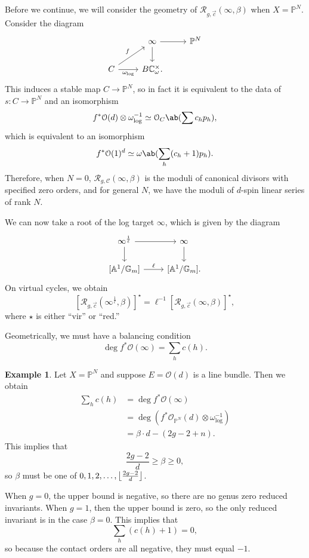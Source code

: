 \documentclass[10pt]{amsart}
\DeclarePairedDelimiter{\floor}{\lfloor}{\rfloor}
\theoremstyle{definition}
\newtheorem{exm}[thm]{Example}
\theoremstyle{remark}
\theoremstyle{plain}
\theoremstyle{definition}
\theoremstyle{remark}
\newcommand{\A}{\mathbb{A}}
\newcommand{\G}{\mathbb{G}}
\newcommand{\C}{\mathbb{C}}
\renewcommand{\P}{\mathbb{P}}
\newcommand{\mc}[1]{\mathcal{#1}}
\newcommand{\1}{\mathbf{1}}
\newcommand{\2}{\mathbf{2}}
\newcommand{\3}{\mathbf{3}}
\begin{document}
Before we continue, we will consider the geometry of $\mc{R}_{g, \vec{c}}(\infty, \beta)$ when $X = \P^N$. Consider the diagram
\begin{equation*}
\begin{tikzcd}
    & \infty \ar{r} \ar{d} & \P^N \\
    C \ar{ur}{f} \ar[swap]{r}{\omega_{\log}} & B \C_{\omega}^{\times}.
\end{tikzcd}
\end{equation*}
This induces a stable map $C \to \P^N$, so in fact it is equivalent to the data of $s \colon C \to \P^N$ and an isomorphism
\[ f^* \mc{O}(d) \otimes \omega_{\log}^{-1} \simeq \mc{O}_C\ab(\sum c_h p_h), \]
which is equivalent to an isomorphism
\[ f^* \mc{O}(1)^d \simeq \omega \ab(\sum_h (c_h+1)p_h). \]
Therefore, when $N = 0$, $\mc{R}_{g,\mc{C}}(\infty, \beta)$ is the moduli of canonical divisors with specified zero orders, and for general $N$, we have the moduli of $d$-spin linear series of rank $N$.

We can now take a root of the log target $\infty$, which is given by the diagram
\begin{equation*}
\begin{tikzcd}
    \infty^{\frac{1}{\ell}} \ar{r} \ar{d} & \infty \ar{d} \\
    {[\A^1/\G_m]} \ar{r}{\ell} & {[\A^1/\G_m]}.
\end{tikzcd}
\end{equation*}
On virtual cycles, we obtain
\[ [\mc{R}_{g, \vec{c}}(\infty^{\frac{1}{\ell}}, \beta)]^{\star} = \ell^{-1} [\mc{R}_{g, \vec{c}}(\infty, \beta)]^{\star}, \]
where $\star$ is either ``vir'' or ``red.''

Geometrically, we must have a balancing condition
\[ \deg f^* \mc{O}(\infty) = \sum_h c(h). \]

\begin{exm}
    Let $X = \P^N$ and suppose $E = \mc{O}(d)$ is a line bundle. Then we obtain
    \begin{align*}
        \sum_h c(h) &= \deg f^* \mc{O}(\infty) \\
        &= \deg (f^* \mc{O}_{\P^N}(d)\otimes \omega_{\log}^{-1}) \\
        &= \beta \cdot d - (2g-2+n).
    \end{align*}
    This implies that
    \[ \frac{2g-2}{d} \geq \beta \geq 0, \]
    so $\beta$ must be one of $0,1,2,\ldots,\floor*{\frac{2g-2}{d}}$.

    When $g=0$, the upper bound is negative, so there are no genus zero reduced invariants. When $g=1$, then the upper bound is zero, so the only reduced invariant is in the case $\beta = 0$. This implies that
    \[ \sum_h (c(h)+1) = 0, \]
    so because the contact orders are all negative, they must equal $-1$.
\end{exm}
\end{document}
